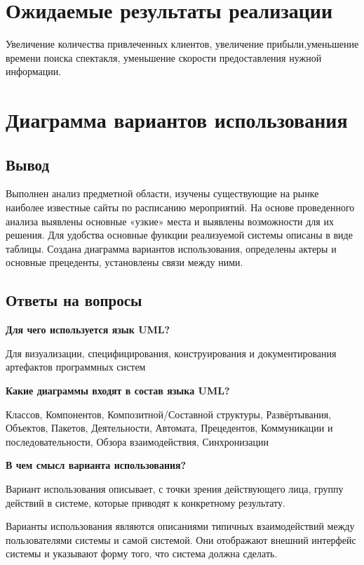 \section{Ожидаемые результаты реализации}
Увеличение количества привлеченных клиентов, увеличение прибыли,уменьшение времени поиска спектакля, уменьшение скорости предоставления нужной информации.
\newpage

\section{Диаграмма вариантов использования}


\newpage

\subsection*{Вывод}
Выполнен анализ предметной области, изучены
существующие на рынке наиболее известные сайты по расписанию мероприятий.
На основе проведенного анализа выявлены основные «узкие»
места и выявлены возможности для их решения.
Для удобства основные
функции реализуемой системы описаны в виде таблицы.
Создана диаграмма
вариантов использования, определены актеры и основные прецеденты,
установлены связи между ними.
\newpage

\subsection*{Ответы на вопросы}
\textbf{Для чего используется язык UML?}\par
Для визуализации, специфицирования, конструирования и документирования артефактов программных систем\par

\textbf{Какие диаграммы входят в состав языка UML?}\par
Классов, Компонентов, Композитной/Составной структуры, Развёртывания, Объектов, Пакетов, Деятельности, Автомата,
Прецедентов, Коммуникации и последовательности, Обзора взаимодействия, Синхронизации\par

\textbf{В чем смысл варианта использования?}\par
Вариант использования описывает, с точки зрения действующего лица, группу действий в системе,
которые приводят к конкретному результату. \par
Варианты использования являются описаниями типичных взаимодействий между пользователями системы и самой системой.
Они отображают внешний интерфейс системы и указывают форму того, что система должна сделать.

